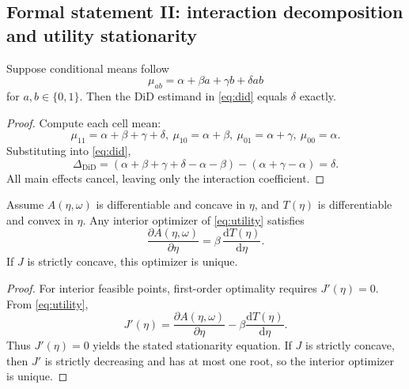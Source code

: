 \subsection{Formal statement II: interaction decomposition and utility stationarity}
\begin{theorem}\label{thm:did}
Suppose conditional means follow
\[
\mu_{ab}=\alpha+\beta a+\gamma b+\delta ab
\]
for $a,b\in\{0,1\}$. Then the DiD estimand in \eqref{eq:did} equals $\delta$ exactly.
\end{theorem}
\begin{proof}
Compute each cell mean:
\[
\mu_{11}=\alpha+\beta+\gamma+\delta,\ \mu_{10}=\alpha+\beta,\ \mu_{01}=\alpha+\gamma,\ \mu_{00}=\alpha.
\]
Substituting into \eqref{eq:did},
\[
\Delta_{\mathrm{DiD}}=(\alpha+\beta+\gamma+\delta-\alpha-\beta)-(\alpha+\gamma-\alpha)=\delta.
\]
All main effects cancel, leaving only the interaction coefficient.\qedhere
\end{proof}

\begin{lemma}\label{lem:utility}
Assume $A(\eta,\omega)$ is differentiable and concave in $\eta$, and $T(\eta)$ is differentiable and convex in $\eta$. Any interior optimizer of \eqref{eq:utility} satisfies
\[
\frac{\partial A(\eta,\omega)}{\partial\eta}=\beta\,\frac{\mathrm{d}T(\eta)}{\mathrm{d}\eta}.
\]
If $J$ is strictly concave, this optimizer is unique.
\end{lemma}
\begin{proof}
For interior feasible points, first-order optimality requires $J'(\eta)=0$. From \eqref{eq:utility},
\[
J'(\eta)=\frac{\partial A(\eta,\omega)}{\partial\eta}-\beta\frac{\mathrm{d}T(\eta)}{\mathrm{d}\eta}.
\]
Thus $J'(\eta)=0$ yields the stated stationarity equation. If $J$ is strictly concave, then $J'$ is strictly decreasing and has at most one root, so the interior optimizer is unique.\qedhere
\end{proof}

